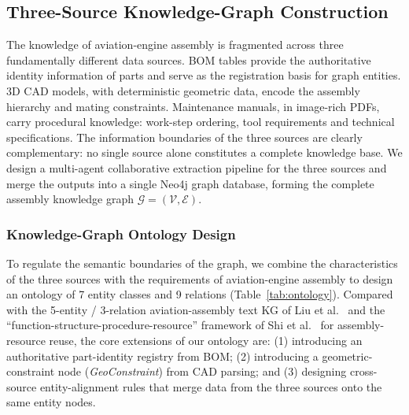 \documentclass[applsci,article,submit,pdftex,moreauthors]{Definitions/mdpi}
\begin{document}
\subsection{Three-Source Knowledge-Graph Construction}
\label{sec:kg}

The knowledge of aviation-engine assembly is fragmented across three fundamentally different data sources. BOM tables provide the authoritative identity information of parts and serve as the registration basis for graph entities. 3D CAD models, with deterministic geometric data, encode the assembly hierarchy and mating constraints. Maintenance manuals, in image-rich PDFs, carry procedural knowledge: work-step ordering, tool requirements and technical specifications. The information boundaries of the three sources are clearly complementary: no single source alone constitutes a complete knowledge base. We design a multi-agent collaborative extraction pipeline for the three sources and merge the outputs into a single Neo4j graph database, forming the complete assembly knowledge graph $\mathcal{G}=(\mathcal{V},\mathcal{E})$.

\subsubsection{Knowledge-Graph Ontology Design}
\label{sec:ontology}

To regulate the semantic boundaries of the graph, we combine the characteristics of the three sources with the requirements of aviation-engine assembly to design an ontology of 7 entity classes and 9 relations (Table~\ref{tab:ontology}). Compared with the 5-entity / 3-relation aviation-assembly text KG of Liu et al.~\citep{liu2023avkg} and the ``function-structure-procedure-resource'' framework of Shi et al.~\citep{shi2022arkg} for assembly-resource reuse, the core extensions of our ontology are: (1) introducing an authoritative part-identity registry from BOM; (2) introducing a geometric-constraint node (\textit{GeoConstraint}) from CAD parsing; and (3) designing cross-source entity-alignment rules that merge data from the three sources onto the same entity nodes.
\end{document}
